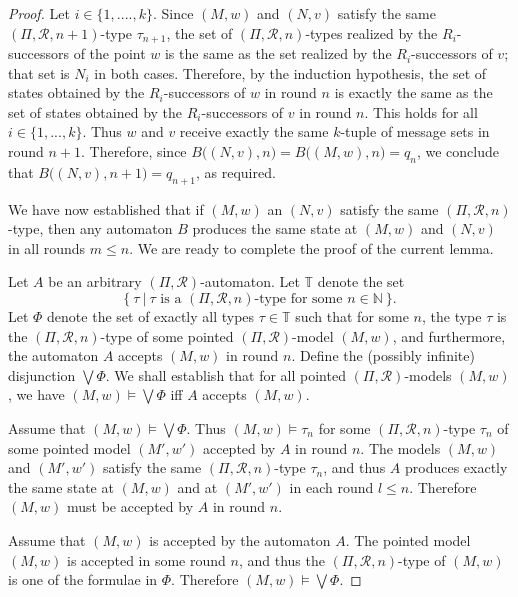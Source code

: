 \documentclass[copyright,creativecommons]{eptcs}
\begin{document}
\begin{proof}
Let $i\in\{1,....,k\}$.
Since $(M,w)$ and $(N,v)$ satisfy the same $(\Pi,\mathcal{R},n+1)$-type $\tau_{n+1}$,
the set of  $(\Pi,\mathcal{R},n)$-types realized
by the $R_i$-successors of the point $w$
is the same as the set realized by the $R_i$-successors of $v$;
that set is $N_i$ in both cases. Therefore, by the induction hypothesis, the set of
states obtained by the $R_i$-successors of $w$
in round $n$ is exactly the same as the set of
states obtained by the $R_i$-successors of $v$
in round $n$. This holds for all $i\in\{1,...,k\}$.
Thus $w$ and $v$ receive exactly the same $k$-tuple of message sets in round $n+1$.
Therefore, since $B\bigl((N,v),n\bigr) = B\bigl((M,w),n\bigr) = q_n$, we conclude that
$B\bigl((N,v),n+1\bigr) = q_{n+1}$, as required.








We have now established that if $(M,w)$ an $(N,v)$ satisfy the same $(\Pi,\mathcal{R},n)$-type,
then any automaton $B$ produces the same state at $(M,w)$ and $(N,v)$ in all rounds $m\leq n$.
We are ready to complete the proof of the current lemma.




Let $A$ be an arbitrary $(\Pi,\mathcal{R})$-automaton.
Let $\mathbb{T}$ denote the set 
$$\{\ \tau\ |\ \tau\text{ is a }(\Pi,\mathcal{R},n)\text{-type for some }n\in\mathbb{N}\ \}.$$
Let $\Phi$ denote the set of exactly all types $\tau\in\mathbb{T}$ such
that for some $n$, the type $\tau$ is the $(\Pi,\mathcal{R},n)$-type of 
some pointed $(\Pi,\mathcal{R})$-model $(M,w)$, and furthermore, the automaton $A$
accepts $(M,w)$ in round $n$. Define the (possibly infinite) disjunction $\bigvee\Phi$.
We shall establish that for all pointed $(\Pi,\mathcal{R})$-models $(M,w)$,
we have $(M,w)\models\bigvee\Phi$ iff 
$A$ accepts $(M,w)$. 




Assume that $(M,w)\models\bigvee\Phi$. Thus
$(M,w)\models\tau_n$ for some $(\Pi,\mathcal{R},n)$-type $\tau_n$ of some pointed model $(M',w')$
accepted by $A$ in round $n$.
The models $(M,w)$ and $(M',w')$ satisfy the same $(\Pi,\mathcal{R},n)$-type $\tau_n$,
and thus $A$ produces exactly the same
state at $(M,w)$ and at $(M',w')$ in each round $l\leq n$.
Therefore $(M,w)$ must be accepted by $A$ in round $n$.




Assume that $(M,w)$ is accepted by the automaton $A$.
The pointed model $(M,w)$ is accepted in some round $n$,
and thus the $(\Pi,\mathcal{R},n)$-type of $(M,w)$ is one of the formulae in $\Phi$.
Therefore $(M,w)\models\bigvee\Phi$.





\end{proof}
\end{document}
